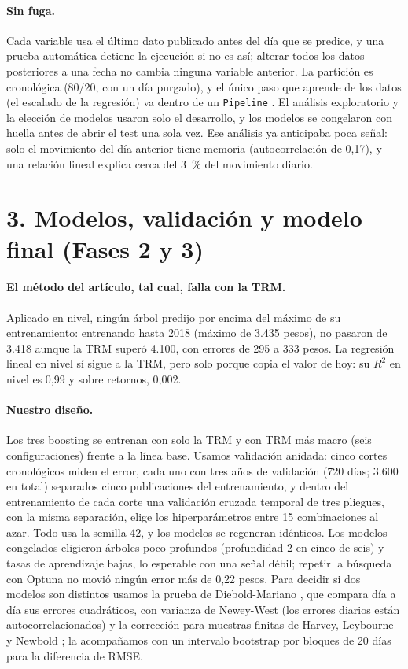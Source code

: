 \documentclass[11pt,letterpaper]{article}
\begin{document}
\paragraph{Sin fuga.} Cada variable usa el último dato publicado antes del día que se predice, y una prueba automática detiene la ejecución si no es así; alterar todos los datos posteriores a una fecha no cambia ninguna variable anterior. La partición es cronológica (80/20, con un día purgado), y el único paso que aprende de los datos (el escalado de la regresión) va dentro de un \texttt{Pipeline} \cite{sklearn}. El análisis exploratorio y la elección de modelos usaron solo el desarrollo, y los modelos se congelaron con huella antes de abrir el test una sola vez. Ese análisis ya anticipaba poca señal: solo el movimiento del día anterior tiene memoria (autocorrelación de 0,17), y una relación lineal explica cerca del 3~\% del movimiento diario.

\section*{3. Modelos, validación y modelo final (Fases 2 y 3)}

\paragraph{El método del artículo, tal cual, falla con la TRM.} Aplicado en nivel, ningún árbol predijo por encima del máximo de su entrenamiento: entrenando hasta 2018 (máximo de 3.435 pesos), no pasaron de 3.418 aunque la TRM superó 4.100, con errores de 295 a 333 pesos. La regresión lineal en nivel sí sigue a la TRM, pero solo porque copia el valor de hoy: su $R^2$ en nivel es 0,99 y sobre retornos, 0,002.

\paragraph{Nuestro diseño.} Los tres boosting se entrenan con solo la TRM y con TRM más macro (seis configuraciones) frente a la línea base. Usamos validación anidada: cinco cortes cronológicos miden el error, cada uno con tres años de validación (720 días; 3.600 en total) separados cinco publicaciones del entrenamiento, y dentro del entrenamiento de cada corte una validación cruzada temporal de tres pliegues, con la misma separación, elige los hiperparámetros entre 15 combinaciones al azar. Todo usa la semilla 42, y los modelos se regeneran idénticos. Los modelos congelados eligieron árboles poco profundos (profundidad 2 en cinco de seis) y tasas de aprendizaje bajas, lo esperable con una señal débil; repetir la búsqueda con Optuna \cite{optuna} no movió ningún error más de 0,22 pesos. Para decidir si dos modelos son distintos usamos la prueba de Diebold-Mariano \cite{dm}, que compara día a día sus errores cuadráticos, con varianza de Newey-West \cite{nw} (los errores diarios están autocorrelacionados) y la corrección para muestras finitas de Harvey, Leybourne y Newbold \cite{hln}; la acompañamos con un intervalo bootstrap por bloques de 20 días para la diferencia de RMSE.
\end{document}
